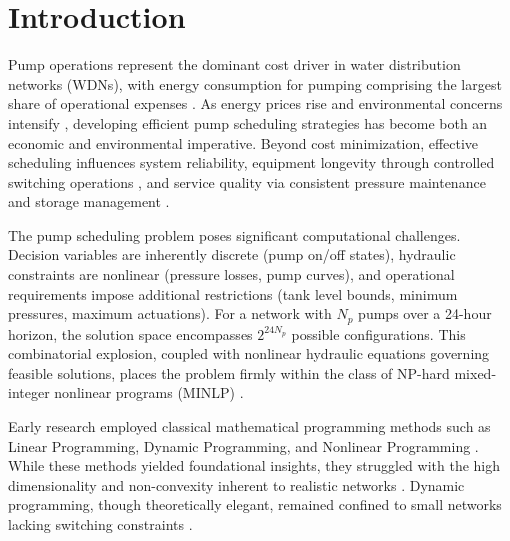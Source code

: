 \documentclass[final,3p,twocolumn]{elsarticle}
\begin{document}
\section{Introduction}

Pump operations represent the dominant cost driver in water distribution networks (WDNs), with energy consumption for pumping comprising the largest share of operational expenses \cite{Paola2024}. As energy prices rise and environmental concerns intensify \cite{Reis2023}, developing efficient pump scheduling strategies has become both an economic and environmental imperative. Beyond cost minimization, effective scheduling influences system reliability, equipment longevity through controlled switching operations \cite{Lansey1994,Costa2016}, and service quality via consistent pressure maintenance and storage management \cite{Reis2023}.

The pump scheduling problem poses significant computational challenges. Decision variables are inherently discrete (pump on/off states), hydraulic constraints are nonlinear (pressure losses, pump curves), and operational requirements impose additional restrictions (tank level bounds, minimum pressures, maximum actuations). For a network with $N_p$ pumps over a 24-hour horizon, the solution space encompasses $2^{24 N_p}$ possible configurations. This combinatorial explosion, coupled with nonlinear hydraulic equations governing feasible solutions, places the problem firmly within the class of NP-hard mixed-integer nonlinear programs (MINLP) \cite{Fooladivanda2018,Verleye2016}.

Early research employed classical mathematical programming methods such as Linear Programming, Dynamic Programming, and Nonlinear Programming \cite{Brion1991,Jowitt1992}. While these methods yielded foundational insights, they struggled with the high dimensionality and non-convexity inherent to realistic networks \cite{Candelieri2018,Reis2023}. Dynamic programming, though theoretically elegant, remained confined to small networks lacking switching constraints \cite{Lansey1994}.
\end{document}
